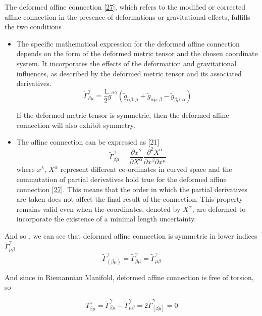 \documentclass{article}
\begin{document}
The deformed affine connection \eqref{27}, which refers to the modified or corrected affine connection in the presence of deformations or gravitational effects, fulfills the two conditions
\begin{itemize}
    \item The specific mathematical expression for the deformed affine connection depends on the form of the deformed metric tensor and the chosen coordinate system. It incorporates the effects of the deformation and gravitational influences, as described by the deformed metric tensor and its associated derivatives.
\begin{equation}
    \tilde{\Gamma}^{\gamma}_{\beta\mu} = \frac{1}{2} \tilde{g}^{\alpha\gamma} (\tilde{g}_{\alpha\beta,\mu} + \tilde{g}_{\alpha\mu,\beta} - \tilde{g}_{\beta\mu,\alpha})
\label{23}
\end{equation}

If the deformed metric tensor is symmetric, then the deformed affine connection will also exhibit symmetry.

\item The affine connection can be expressed as [21]
\begin{equation}
    \tilde{\Gamma}^{\gamma}_{\beta\mu} =\frac{\partial x^{\gamma}}{\partial X^{\alpha}} \frac{\partial^2 X^{\alpha}}{\partial x^{\beta} \partial x^{\mu}}
\label{24} 
\end{equation}
where $x^\lambda$, $X^\alpha$  represent different co-ordinates in curved space and the commutation of partial derivatives hold true for the deformed affine connection \eqref{27}. This means that the order in which the partial derivatives are taken does not affect the final result of the connection. This property remains valid even when the coordinates, denoted by $X^\alpha$, are deformed to incorporate the existence of a minimal length uncertainty.

\end{itemize}

And so , we can see that deformed affine connection is symmetric in lower indices  $\tilde{\Gamma}^{\gamma}_{\mu\beta}$
\begin{equation}
    \tilde{\Gamma}^{\gamma}_{(\beta\mu)} = \tilde{\Gamma}^{\gamma}_{\beta\mu} = \tilde{\Gamma}^{\gamma}_{\mu\beta}
\label{25}
\end{equation}

And since in Riemannian Manifold, deformed affine connection is free of torsion, so

\begin{equation}
    T^{\gamma}_{\beta\mu} = \tilde{\Gamma}^{\gamma}_{\beta\mu} - \tilde{\Gamma}^{\gamma}_{\mu\beta} = 2 \tilde{\Gamma}^{\gamma}_{[\beta\mu]} = 0
\label{26}
\end{equation}
\end{document}
